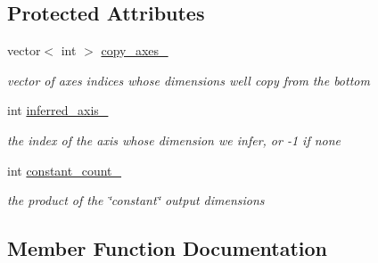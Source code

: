 \subsection*{Protected Attributes}
\begin{DoxyCompactItemize}
\item 
\mbox{\label{classcaffe_1_1_reshape_layer_accb52092dc105175a888368e1ded6a12}} 
vector$<$ int $>$ \mbox{\hyperlink{classcaffe_1_1_reshape_layer_accb52092dc105175a888368e1ded6a12}{copy\+\_\+axes\+\_\+}}
\begin{DoxyCompactList}\small\item\em vector of axes indices whose dimensions we\textquotesingle{}ll copy from the bottom \end{DoxyCompactList}\item 
\mbox{\label{classcaffe_1_1_reshape_layer_a41111d585f1a9a64fd774ca1bf7d4160}} 
int \mbox{\hyperlink{classcaffe_1_1_reshape_layer_a41111d585f1a9a64fd774ca1bf7d4160}{inferred\+\_\+axis\+\_\+}}
\begin{DoxyCompactList}\small\item\em the index of the axis whose dimension we infer, or -\/1 if none \end{DoxyCompactList}\item 
\mbox{\label{classcaffe_1_1_reshape_layer_abbb071bc8398e2b0442302e51c644c28}} 
int \mbox{\hyperlink{classcaffe_1_1_reshape_layer_abbb071bc8398e2b0442302e51c644c28}{constant\+\_\+count\+\_\+}}
\begin{DoxyCompactList}\small\item\em the product of the \char`\"{}constant\char`\"{} output dimensions \end{DoxyCompactList}\end{DoxyCompactItemize}


\subsection{Member Function Documentation}
\mbox{\label{classcaffe_1_1_reshape_layer_ad97ea6043b01351e85b39b512ae0e489}} 
